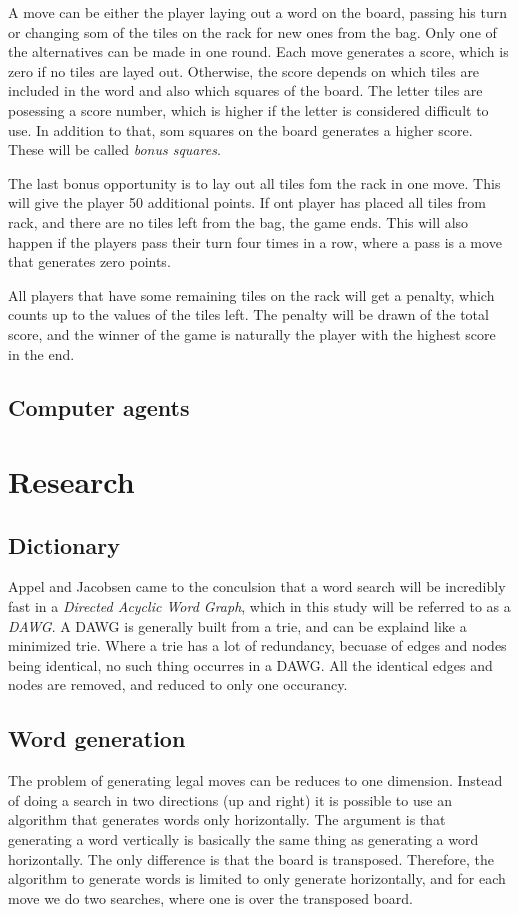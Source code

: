 \documentclass[a4paper, 12pt]{report}
\begin{document}
A move can be either the player laying out a word on the board, passing his turn or changing som of the tiles on the rack for new ones from the bag. Only one of the alternatives can be made in one round. Each move generates a score, which is zero if no tiles are layed out. Otherwise, the score depends on which tiles are included in the word and also which squares of the board. The letter tiles are posessing a score number, which is higher if the letter is considered difficult to use. In addition to that, som squares on the board generates a higher score. These will be called \emph{bonus squares}. 

The last bonus opportunity is to lay out all tiles fom the rack in one move. This will give the player 50  additional points. If ont player has placed all tiles from rack, and there are no tiles left from the bag, the game ends. This will also happen if the players pass their turn four times in a row, where a pass is a move that generates zero points. 

All players that have some remaining tiles on the rack will get a penalty, which counts up to the values of the tiles left. The penalty will be drawn of the total score, and the winner of the game is naturally the player with the highest score in the end.

\subsection{Computer agents}
\section{Research}
\subsection{Dictionary}
Appel and Jacobsen \cite{fastest} came to the conculsion that a word search will be incredibly fast in a \emph{Directed Acyclic Word Graph}, which in this study will be referred to as a \emph{DAWG}. A DAWG is generally built from a trie, and can be explaind like a minimized trie. Where a trie has a lot of redundancy, becuase of edges and nodes being identical, no such thing occurres in a DAWG. All the identical edges and nodes are removed, and reduced to only one occurancy. 

\subsection{Word generation}
The problem of generating legal moves can be reduces to one dimension. Instead of doing a search in two directions (up and right) it is possible to use an algorithm that generates words only horizontally. The argument is that generating a word vertically is basically the same thing as generating a word horizontally. The only difference is that the board is transposed. Therefore, the algorithm to generate words is limited to only generate horizontally, and for each move we do two searches, where one is over the transposed board.
\end{document}
